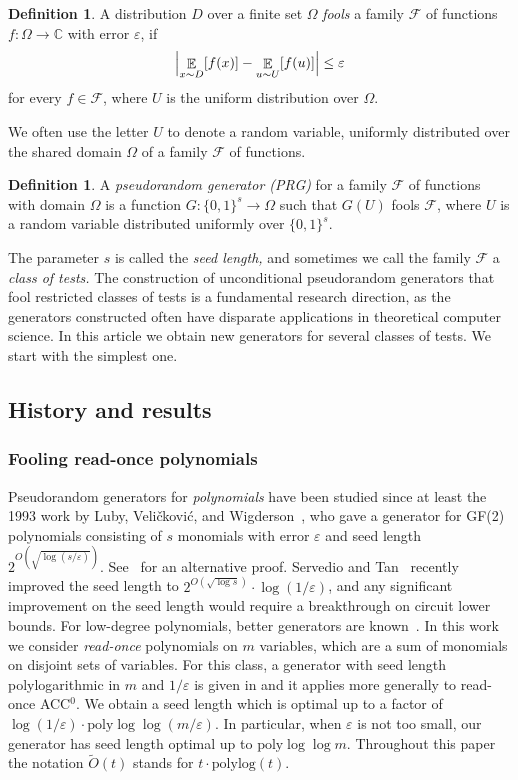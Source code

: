 \documentclass[11pt]{article}
\numberwithin{equation}{section}
\theoremstyle{definition}
\newtheorem{definition}[theorem]{Definition}
\theoremstyle{plain}
\newcommand{\C}{\mathbb C}
\newcommand{\zo}{\{0,1\}}
\def\eps{\varepsilon}
\def\calF{\mathcal{F}}
\def\poly{\mathrm{poly}}
\def\polylog{\mathrm{polylog}}
\DeclareMathOperator*{\E}{\mathbb{E}}                 %
\begin{document}
%
%
%
\begin{definition}
A distribution $D$  %
over a finite set $\Omega$   %
\emph{fools} a
%
family $\calF$ of functions    %
%
%
%
$f \colon\Omega\to\C$  %
%
%
with error $\eps$, if
  \[
    \Bigl| \E_{x\sim D}[f(x)] - \E_{u\sim U}[f(u)] \Bigr| \le \eps 
  \]
  for every $f\in \calF$, where $U$ is
the %
  uniform distribution
  over $\Omega$.   %
\end{definition}
We often
%
use    %
the letter $U$ to denote a random variable,
%
%
uniformly distributed  %
over the 
%
shared domain $\Omega$ of a 
%
%
family $\calF$ of functions.  %
%
%
%
%
\begin{definition}
A \emph{pseudorandom generator (PRG)} for a family
%
$\calF$ of functions with domain $\Omega$
is a function 
%
$G\colon\zo^s \to \Omega$   %
such that $G(U)$ fools $\calF$, where $U$ is a random variable distributed
%
uniformly over $\zo^s$.  %
\end{definition}
The parameter $s$ is called the
\emph{seed length,}  %
and sometimes we call the family $\calF$ a
\emph{class of tests.} %
The construction of unconditional pseudorandom generators that fool restricted
classes of tests is a fundamental research direction, as the generators
constructed  %
%
often have 
%
disparate applications
in theoretical computer science.  %
%
%
In this
%
article  %
we obtain new generators for several classes of tests.
We start with the simplest one.  %

\subsection{History and results}  %

\subsubsection{Fooling read-once polynomials} %
Pseudorandom generators for \emph{polynomials} have been studied
since at least the 1993 work by Luby, Veli{\v c}kovi{\'c}, and
Wigderson~\cite{LubyVW93}, who gave a generator for GF(2) polynomials consisting of $s$ monomials with error $\eps$ and seed length $2^{O(\sqrt{\log(s/\eps)})}$.
See~\cite{Viola-SYMAC0} for an alternative proof.  
Servedio and Tan~\cite{ServedioT19} recently improved the seed length 
to $2^{O(\sqrt{\log s})} \cdot \log(1/\eps)$, and any significant 
improvement on the seed length would require
%
%
a breakthrough  %
on circuit lower bounds.  For low-degree polynomials,
better generators are known~\cite{BogdanovV10,Lovett09,Viola-d}.  
In this work we consider \emph{read-once} polynomials on $m$ variables, 
which are a sum of monomials on disjoint
sets of   %
variables.
For this class, a generator with seed length
polylogarithmic in $m$ and $1/\eps$ is given in \cite{GavinskyLS12} and it
applies more generally to read-once ACC$^0$. 
We obtain a seed length which is optimal up to a factor of $\log(1/\eps) \cdot \poly\log\log(m/\eps)$.
In particular, when $\eps$ is not too small,
our generator has seed length optimal up to $\poly \log \log m$.
Throughout this paper the notation $\tilde{O}(t)$ stands for 
$t \cdot \polylog(t)$.
\end{document}
